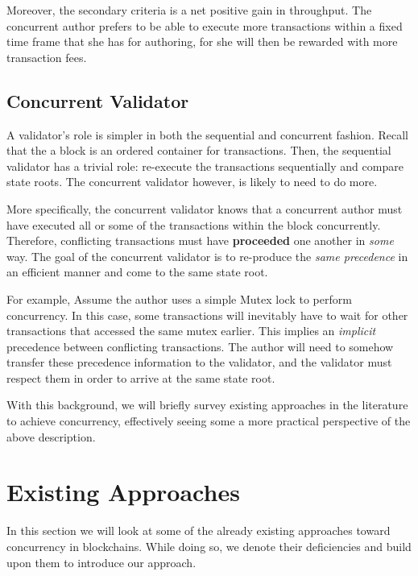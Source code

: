 Moreover, the secondary criteria is a net positive gain in throughput. The concurrent author prefers
to be able to execute more transactions within a fixed time frame that she has for authoring, for
she will then be rewarded with more transaction fees.

\subsection{Concurrent Validator}

A validator's role is simpler in both the sequential and concurrent fashion. Recall that the a block
is an ordered container for transactions. Then, the sequential validator has a trivial role:
re-execute the transactions sequentially and compare state roots. The concurrent validator however,
is likely to need to do more.

More specifically, the concurrent validator knows that a concurrent author must have executed all or
some of the transactions within the block concurrently. Therefore, conflicting transactions must
have \textbf{proceeded} one another in \textit{some} way. The goal of the concurrent validator is to
re-produce the \textit{same precedence} in an efficient manner and come to the same state root.

For example, Assume the author uses a simple Mutex lock to perform concurrency. In this case, some
transactions will inevitably have to wait for other transactions that accessed the same mutex
earlier. This implies an \textit{implicit} precedence between conflicting transactions. The author
will need to somehow transfer these precedence information to the validator, and the validator must
respect them in order to arrive at the same state root.

With this background, we will briefly survey existing approaches in the literature to achieve
concurrency, effectively seeing some a more practical perspective of the above description.

\section{Existing Approaches}


In this section we will look at some of the already existing approaches toward concurrency in
blockchains. While doing so, we denote their deficiencies and build upon them to introduce our
approach.

